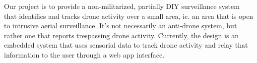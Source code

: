 Our project is to provide a non-militarized, partially DIY surveillance system that identifies and tracks drone activity over a small area, ie. an area that is open to intrusive aerial surveillance. It’s not necessarily an anti-drone system, but rather one that reports trespassing drone activity. Currently, the design is an embedded system that uses sensorial data to track drone activity and relay that information to the user through a web app interface.
